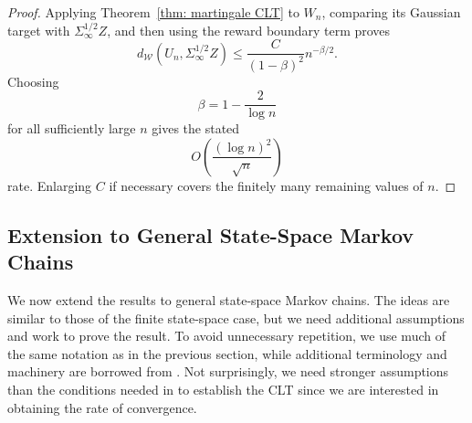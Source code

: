 \documentclass[11pt]{article}
\begin{document}
\begin{proof}
Applying Theorem~\ref{thm: martingale CLT} to $W_n$, comparing its
Gaussian target with $\Sigma_\infty^{1/2}Z$, and then using the
reward boundary term proves
\[
d_{\mathcal W}(U_n,\Sigma_\infty^{1/2}Z)
\leq
\frac{C}{(1-\beta)^2}n^{-\beta/2}.
\]
Choosing
\[
\beta=1-\frac{2}{\log n}
\]
for all sufficiently large $n$ gives the stated
\[
O\left(\frac{(\log n)^2}{\sqrt n}\right)
\]
rate. Enlarging $C$ if necessary covers the finitely many remaining
values of $n$.
\end{proof}

\subsection{Extension to General State-Space Markov Chains}

We now extend the results to general state-space Markov chains. The ideas are similar to those of the finite state-space case, but we need additional assumptions and work to prove the result. To avoid unnecessary repetition, we use much of the same notation as in the previous section, while additional terminology and machinery are borrowed from \citep{meyn2012markov}. Not surprisingly, we need stronger assumptions than the conditions needed in \citep{meyn2012markov} to establish the CLT since we are interested in obtaining the rate of convergence.
\end{document}
